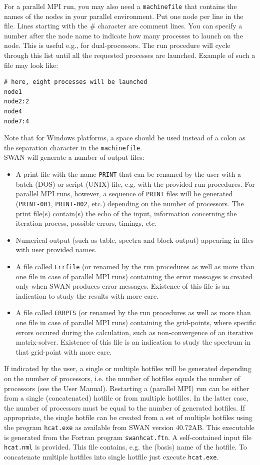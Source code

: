 \documentclass[12pt]{book}
\begin{document}
\noindent
For a parallel MPI run, you may also need a {\tt machinefile} that contains the names of the
nodes in your parallel environment. Put one node per line in the file. Lines starting with
the \# character are comment lines. You can specify a number after the node name to indicate
how many processes to launch on the node. This is useful e.g., for dual-processors. The run
procedure will cycle through this list until all the requested processes are launched. Example
of such a file may look like:
\begin{verbatim}
# here, eight processes will be launched
node1
node2:2
node4
node7:4
\end{verbatim}
Note that for Windows platforms, a space should be used instead of a colon as the separation
character in the {\tt machinefile}.
\\[2ex]
\noindent
SWAN will generate a number of output files:
\begin{itemize}
   \item A print file with the name {\tt PRINT} that can be renamed by the user with a batch (DOS) or
         script (UNIX) file, e.g. with the provided run procedures. For parallel MPI runs, however,
         a sequence of {\tt PRINT} files will be generated ({\tt PRINT-001}, {\tt PRINT-002}, etc.)
         depending on the number of processors. The print file(s) contain(s) the echo of the input,
         information concerning the iteration process, possible errors, timings, etc.
   \item Numerical output (such as table, spectra and block output) appearing in files with user
         provided names.
   \item A file called {\tt Errfile} (or renamed by the run procedures as well as more than one file in
         case of parallel MPI runs) containing the error messages is created only when SWAN produces
         error messages. Existence of this file is an indication to study the results with more care.
   \item A file called {\tt ERRPTS} (or renamed by the run procedures as well as more than one file in
         case of parallel MPI runs) containing the grid-points, where specific errors occured during
         the calculation, such as non-convergence of an iterative matrix-solver. Existence of this file
         is an indication to study the spectrum in that grid-point with more care.
\end{itemize}
If indicated by the user, a single or multiple hotfiles will be generated depending on the number of
processors, i.e. the number of hotfiles equals the number of processors (see the User Manual). Restarting
a (parallel MPI) run can be either from a single (concatenated) hotfile or from multiple hotfiles.
In the latter case, the number of processors must be equal to the number of generated hotfiles. If
appropriate, the single hotfile can be created from a set of multiple hotfiles using the program
{\tt hcat.exe} as available from SWAN version 40.72AB. This executable is generated from the Fortran
program {\tt swanhcat.ftn}. A self-contained input file {\tt hcat.nml} is provided. This file contains,
e.g. the (basis) name of the hotfile. To concatenate multiple hotfiles into single hotfile just execute
{\tt hcat.exe}.
\end{document}
